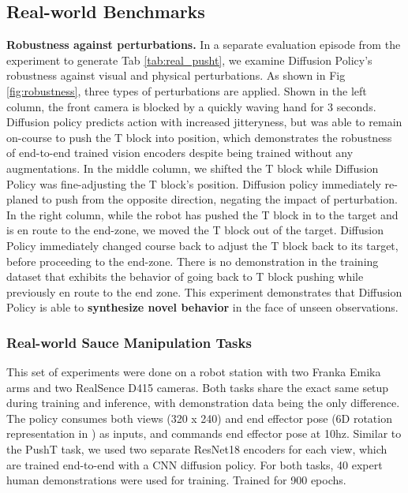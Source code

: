 \subsection{Real-world Benchmarks}

\textbf{Robustness against perturbations.}
In a separate evaluation episode from the experiment to generate Tab \ref{tab:real_pusht}, we examine Diffusion Policy's robustness against visual and physical perturbations. As shown in Fig \ref{fig:robustness}, three types of perturbations are applied. Shown in the left column, the front camera is blocked by a quickly waving hand for 3 seconds. Diffusion policy predicts action with increased jitteryness, but was able to remain on-course to push the T block into position, which demonstrates the robustness of end-to-end trained vision encoders despite being trained without any augmentations. In the middle column, we shifted the T block while Diffusion Policy was fine-adjusting the T block's position. Diffusion policy immediately re-planed to push from the opposite direction, negating the impact of perturbation. In the right column, while the robot has pushed the T block in to the target and is en route to the end-zone, we moved the T block out of the target. Diffusion Policy immediately changed course back to adjust the T block back to its target, before proceeding to the end-zone. There is no demonstration in the training dataset that exhibits the behavior of going back to T block pushing while previously en route to the end zone. This experiment demonstrates that Diffusion Policy is able to \textbf{synthesize novel behavior} in the face of unseen observations.





\subsubsection{Real-world Sauce Manipulation Tasks}
This set of experiments were done on a robot station with two Franka Emika arms and two RealSence D415 cameras. Both tasks share the exact same setup during training and inference, with demonstration data being the only difference. The policy consumes both views (320 x 240) and end effector pose (6D rotation representation in \cite{zhou2019continuity}) as inputs, and commands end effector pose at 10hz. Similar to the PushT task, we used two separate ResNet18 encoders for each view, which are trained end-to-end with a CNN diffusion policy. For both tasks, 40 expert human demonstrations were used for training. Trained for 900 epochs.

